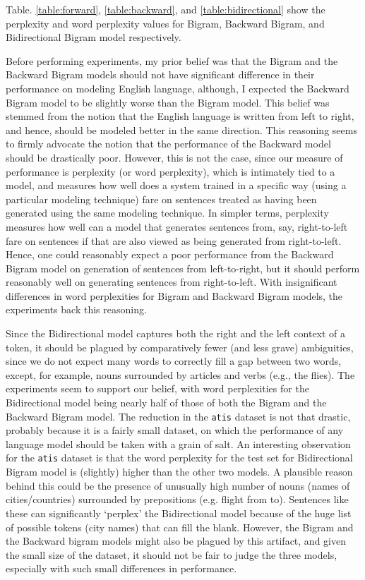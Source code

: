 \documentclass[12pt]{article}
\begin{document}
Table. \ref{table:forward}, \ref{table:backward}, and \ref{table:bidirectional} show the perplexity and word perplexity values for Bigram, Backward Bigram, and Bidirectional Bigram model respectively.

Before performing experiments, my prior belief was that the Bigram and the Backward Bigram models should not have significant difference in their performance on modeling English language, although, I expected the Backward Bigram model to be slightly worse than the Bigram model. This belief was stemmed from the notion that the English language is written from left to right, and hence, should be modeled better in the same direction. This reasoning seems to firmly advocate the notion that the performance of the Backward model should be drastically poor. However, this is not the case, since our measure of performance is perplexity (or word perplexity), which is intimately tied to a model, and measures how well does a system trained in a specific way (using a particular modeling technique) fare on sentences treated as having been generated using the same modeling technique. In simpler terms, perplexity measures how well can a model that generates sentences from, say, right-to-left fare on sentences if that are also viewed as being generated from right-to-left. Hence, one could reasonably expect a poor performance from the Backward Bigram model on generation of sentences from left-to-right, but it should perform reasonably well on generating sentences from right-to-left. With insignificant differences in word perplexities for Bigram and Backward Bigram models, the experiments back this reasoning.

Since the Bidirectional model captures both the right and the left context of a token, it should be plagued by comparatively fewer (and less grave) ambiguities, since we do not expect many words to correctly fill a gap between two words, except, for example, nouns surrounded by articles and verbs (e.g., the \underline{\hspace{0.5cm}} flies). The experiments seem to support our belief, with word perplexities for the Bidirectional model being nearly half of those of both the Bigram and the Backward Bigram model. The reduction in the \texttt{atis} dataset is not that drastic, probably because it is a fairly small dataset, on which the performance of any language model should be taken with a grain of salt. An interesting observation for the \texttt{atis} dataset is that the word perplexity for the test set for Bidirectional Bigram model is (slightly) higher than the other two models. A plausible reason behind this could be the presence of unusually high number of nouns (names of cities/countries) surrounded by prepositions (e.g. flight from \underline{\hspace{0.5cm}} to). Sentences like these can significantly `perplex' the Bidirectional model because of the huge list of possible tokens (city names) that can fill the blank. However, the Bigram and the Backward bigram models might also be plagued by this artifact, and given the small size of the dataset, it should not be fair to judge the three models, especially with such small differences in performance.
\end{document}
